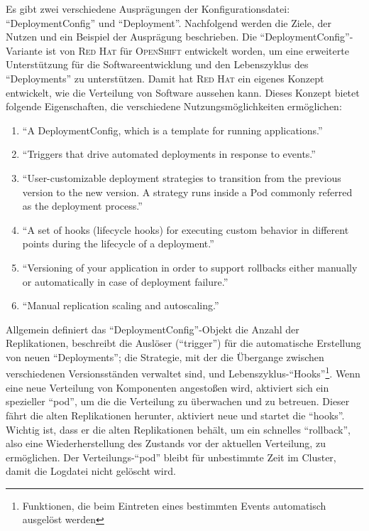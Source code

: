 Es gibt zwei verschiedene Ausprägungen der Konfigurationsdatei: \enquote{DeploymentConfig} und \enquote{Deployment}. Nachfolgend werden die Ziele, der Nutzen und ein Beispiel der Ausprägung beschrieben. Die \enquote{DeploymentConfig}-Variante ist von \textsc{Red Hat} für \textsc{OpenShift} entwickelt worden, um eine erweiterte Unterstützung für die Softwareentwicklung und den Lebenszyklus des \enquote{Deployments} zu unterstützen. Damit hat \textsc{Red Hat} ein eigenes Konzept entwickelt, wie die Verteilung von Software aussehen kann. Dieses Konzept bietet folgende Eigenschaften, die verschiedene Nutzungsmöglichkeiten ermöglichen:\autocite[vgl.][Application\,$\rightarrow$\,Deployments]{red_hat_inc_okd_2019}
\begin{enumerate}
	\item \enquote{A DeploymentConfig, which is a template for running applications.}
	\item \enquote{Triggers that drive automated deployments in response to events.}
	\item \enquote{User-customizable deployment strategies to transition from the previous version to the new version. A strategy runs inside a Pod commonly referred as the deployment process.}
	\item \enquote{A set of hooks (lifecycle hooks) for executing custom behavior in different points during the lifecycle of a deployment.}
	\item \enquote{Versioning of your application in order to support rollbacks either manually or automatically in case of deployment failure.}
	\item \enquote{Manual replication scaling and autoscaling.} 
\end{enumerate}
Allgemein definiert das \enquote{DeploymentConfig}-Objekt die Anzahl der Replikationen, beschreibt die Auslöser (\enquote{trigger}) für die automatische Erstellung von neuen \enquote{Deployments}; die Strategie, mit der die Übergange zwischen verschiedenen Versionsständen verwaltet sind, und Lebenszyklus-\enquote{Hooks}\footnote{Funktionen, die beim Eintreten eines bestimmten Events automatisch ausgelöst werden}. Wenn eine neue Verteilung von Komponenten angestoßen wird, aktiviert sich ein spezieller \enquote{pod}, um die die Verteilung zu überwachen und zu betreuen. Dieser fährt die alten Replikationen herunter, aktiviert neue und startet die \enquote{hooks}. Wichtig ist, dass er die alten Replikationen behält, um ein schnelles \enquote{rollback}, also eine Wiederherstellung des Zustands vor der aktuellen Verteilung, zu ermöglichen. Der Verteilungs-\enquote{pod} bleibt für unbestimmte Zeit im Cluster, damit die Logdatei nicht gelöscht wird. 


